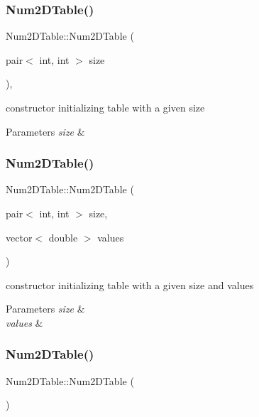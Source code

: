 \subsubsection{\texorpdfstring{Num2\+D\+Table()}{Num2DTable()}\hspace{0.1cm}{\footnotesize\ttfamily [1/3]}}
{\footnotesize\ttfamily Num2\+D\+Table\+::\+Num2\+D\+Table (\begin{DoxyParamCaption}\item[{pair$<$ int, int $>$}]{size }\end{DoxyParamCaption})\hspace{0.3cm}{\ttfamily [inline]}, {\ttfamily [explicit]}}

constructor initializing table with a given size 
\begin{DoxyParams}{Parameters}
{\em size} & \\
\hline
\end{DoxyParams}
\mbox{\label{class_num2_d_table_a43fbd24e26b1867ddd88a7b3d71c5d82}} 
\subsubsection{\texorpdfstring{Num2\+D\+Table()}{Num2DTable()}\hspace{0.1cm}{\footnotesize\ttfamily [2/3]}}
{\footnotesize\ttfamily Num2\+D\+Table\+::\+Num2\+D\+Table (\begin{DoxyParamCaption}\item[{pair$<$ int, int $>$}]{size,  }\item[{vector$<$ double $>$}]{values }\end{DoxyParamCaption})\hspace{0.3cm}{\ttfamily [inline]}}

constructor initializing table with a given size and values 
\begin{DoxyParams}{Parameters}
{\em size} & \\
\hline
{\em values} & \\
\hline
\end{DoxyParams}
\mbox{\label{class_num2_d_table_a059c6372eacdfc2d1e046190db443363}} 
\subsubsection{\texorpdfstring{Num2\+D\+Table()}{Num2DTable()}\hspace{0.1cm}{\footnotesize\ttfamily [3/3]}}
{\footnotesize\ttfamily Num2\+D\+Table\+::\+Num2\+D\+Table (\begin{DoxyParamCaption}{ }\end{DoxyParamCaption})\hspace{0.3cm}{\ttfamily [default]}}

